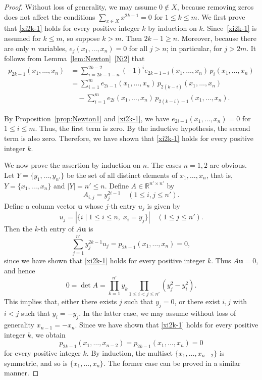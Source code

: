 \documentclass[10pt,a4paper]{amsart}
\newcommand{\R}{\mathbb{R}}
\newcommand{\bu}{\boldsymbol{u}}
\newcommand{\iantipodal}{symmetric}
\begin{document}
\begin{proof}
Without loss of generality, we may assume \(0\notin X\), because removing zeros does not affect the conditions \(\sum_{x\in X} x^{2k-1}=0\) for \(1\le k\le m\).
We first prove that \eqref{xi2k-1} holds for every positive integer \( k \) by induction on \( k \). Since~\ref{xi2k-1} is assumed for \( k\le m \), so suppose \( k>m \). Then \( 2k-1\ge n \). 
Moreover, because there are only \( n \) variables, \( e_j(x_1,\dots,x_n)=0 \) for all \( j>n \); in particular, for \( j>2m \). 
It follows from Lemma~\ref{lem:Newton}~\ref{Ni2} that
\begin{align*}
p_{2k-1}(x_1,\dots,x_n) &= \sum_{i=2k-1-n}^{2k-2} (-1)^i e_{2k-1-i}(x_1,\dots,x_n) \, p_i(x_1,\dots,x_n)\\
&=\sum_{i=1}^{m} e_{2i-1}(x_1,\dots,x_n) \, p_{2(k-i)}(x_1,\dots,x_n)\\
&\quad-\sum_{i=1}^{m} e_{2i}(x_1,\dots,x_n) \, p_{2(k-i)-1}(x_1,\dots,x_n).
\end{align*}


By Proposition~\ref{prop:Newton1} and \eqref{xi2k-1}, 
we have $e_{2i-1}(x_1,\dots,x_n)=0$ for $1\leq i\leq m$.
Thus, the first term is zero.
By the inductive hypothesis,
the second term
is also zero.
Therefore, we have shown that
\eqref{xi2k-1} holds for every positive integer $k$.

We now prove the assertion by induction on $n$.
The cases $n=1,2$ are obvious.
Let $Y=\{y_1,\dots,y_{n'}\}$ be the set of all distinct elements of 
$x_1,\dots,x_n$, that is, $Y=\{x_1,\dots,x_n\}$ and
$|Y|=n'\leq n$.
Define $A\in\R^{n'\times n'}$ by
\[
A_{i,j}=y_j^{2i-1}\quad(1\leq i,j\leq n').
\]
Define a column vector $\bu$ whose $j$-th entry $u_j$ is given by
\[
u_j=|\{i\mid 1\leq i\leq n,\;x_i=y_j\}|\quad(1\leq j\leq n').
\]
Then the $k$-th entry of $A\bu$ is
\[
\sum_{j=1}^{n'} y_j^{2k-1}u_j=p_{2k-1}(x_1,\dots,x_n)=0,
\]
since we have shown that \eqref{xi2k-1} holds for every positive integer $k$.
Thus $A\bu=0$, and hence
\[
0=\det A=\prod_{k=1}^{n'}y_{k}\prod_{1\leq i<j\leq n'}(y_j^2-y_i^2).
\]
This implies that, either there exists $j$ such that $y_{j}=0$, or
there exist $i,j$ with $i<j$ such that $y_i=-y_j$.
In the latter case, we may assume without loss of generality $x_{n-1}=-x_n$.
Since we have shown that \eqref{xi2k-1} holds for every positive integer $k$,
we obtain
\[p_{2k-1}(x_1,\dots,x_{n-2})=p_{2k-1}(x_1,\dots,x_{n})=0\]
for every positive integer $k$.
By induction, the multiset $\{x_1,\dots,x_{n-2}\}$ is \iantipodal,
and so is $\{x_1,\dots,x_{n}\}$.
The former case can be proved in a similar manner.
\end{proof}
\end{document}
